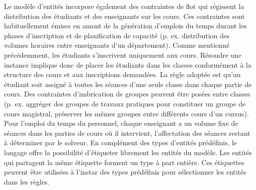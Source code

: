 Le modèle d'entités incorpore également des contraintes de flot qui
régissent %
la distribution des étudiants et des enseignants sur les cours.
Ces contraintes 
sont habituellement émises en amont de la génération d'emplois du temps
durant les phases d'inscription %
et 
de planification de capacité %
(p. ex. distribution des volumes horaires entre enseignants d'un département).
Comme mentionné précédemment, les étudiants s'inscrivent uniquement aux cours. %
Résoudre une instance {\UTP} implique donc de placer les étudiants dans les classes conformément à la structure des cours et aux inscriptions demandées.
%
La règle adoptée est qu'un étudiant soit assigné à toutes les séances d'une seule classe dans chaque partie de cours.
%
Des contraintes d'imbrication de groupes
peuvent être posées entre classes 
(p. ex. aggréger des groupes de travaux pratiques pour constituer un groupe de cours magistral, préserver les mêmes groupes entre différents cours d'un cursus).
%
Pour l'emploi du temps du personnel, chaque enseignant a un volume fixe de séances dans les parties de cours où il intervient, l'affectation des séances restant à déterminer par le solveur.
%
En complément des types d'entités prédéfinis, le langage offre %
la possibilité d'étiqueter
librement les entités du modèle. %
%
Les entités qui partagent la même étiquette forment un type à part entière. %
%
Ces étiquettes peuvent être utilisées à l'instar des types prédéfinis pour sélectionner les entités dans les règles.

